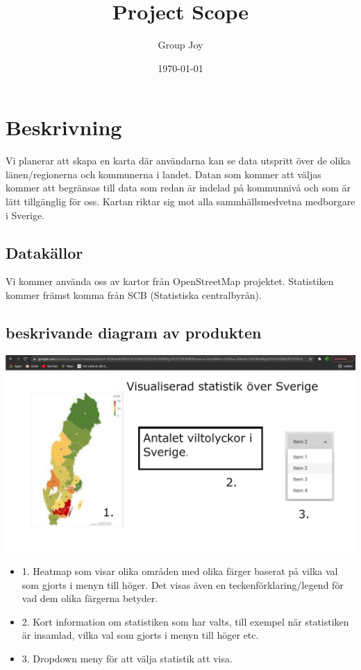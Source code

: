 \documentclass{scrartcl}
\begin{document}
\title{Project Scope}
\author{Group Joy}
\date{\today}
\maketitle

\section{Beskrivning}

Vi planerar att skapa en karta där användarna kan se data utspritt över de olika länen/regionerna och kommunerna i landet.
Datan som kommer att väljas kommer att begränsas till data som redan är indelad på kommunnivå och som är lätt tillgänglig för oss.
Kartan riktar sig mot alla sammhällsmedvetna medborgare i Sverige.

\subsection{Datakällor}

Vi kommer använda oss av kartor från OpenStreetMap projektet.
Statistiken kommer främst komma från SCB (Statistiska centralbyrån).

\subsection{beskrivande diagram av produkten}
\includegraphics{dokument/mockup.jpg}

\begin{itemize}
\item 1. Heatmap som visar olika områden med olika färger baserat på vilka val som gjorts i menyn till höger. Det visas även en teckenförklaring/legend för vad  dem olika färgerna betyder.
\item 2. Kort information om statistiken som har valts, till exempel när statistiken är insamlad, vilka val som gjorts i menyn till höger etc. 
\item 3. Dropdown meny för att välja statistik att visa.
\end{itemize}
\end{document}
